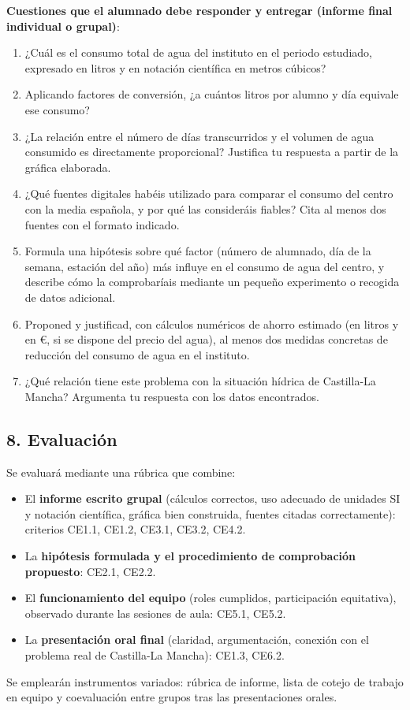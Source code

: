 \documentclass[11pt,a4paper]{article}
\begin{document}
\textbf{Cuestiones que el alumnado debe responder y entregar (informe final individual o grupal)}:
\begin{enumerate}
    \item ¿Cuál es el consumo total de agua del instituto en el periodo estudiado, expresado en litros y en notación científica en metros cúbicos?
    \item Aplicando factores de conversión, ¿a cuántos litros por alumno y día equivale ese consumo?
    \item ¿La relación entre el número de días transcurridos y el volumen de agua consumido es directamente proporcional? Justifica tu respuesta a partir de la gráfica elaborada.
    \item ¿Qué fuentes digitales habéis utilizado para comparar el consumo del centro con la media española, y por qué las consideráis fiables? Cita al menos dos fuentes con el formato indicado.
    \item Formula una hipótesis sobre qué factor (número de alumnado, día de la semana, estación del año) más influye en el consumo de agua del centro, y describe cómo la comprobaríais mediante un pequeño experimento o recogida de datos adicional.
    \item Proponed y justificad, con cálculos numéricos de ahorro estimado (en litros y en €, si se dispone del precio del agua), al menos dos medidas concretas de reducción del consumo de agua en el instituto.
    \item ¿Qué relación tiene este problema con la situación hídrica de Castilla-La Mancha? Argumenta tu respuesta con los datos encontrados.
\end{enumerate}

\subsection*{8. Evaluación}
Se evaluará mediante una rúbrica que combine:
\begin{itemize}
    \item El \textbf{informe escrito grupal} (cálculos correctos, uso adecuado de unidades SI y notación científica, gráfica bien construida, fuentes citadas correctamente): criterios CE1.1, CE1.2, CE3.1, CE3.2, CE4.2.
    \item La \textbf{hipótesis formulada y el procedimiento de comprobación propuesto}: CE2.1, CE2.2.
    \item El \textbf{funcionamiento del equipo} (roles cumplidos, participación equitativa), observado durante las sesiones de aula: CE5.1, CE5.2.
    \item La \textbf{presentación oral final} (claridad, argumentación, conexión con el problema real de Castilla-La Mancha): CE1.3, CE6.2.
\end{itemize}
Se emplearán instrumentos variados: rúbrica de informe, lista de cotejo de trabajo en equipo y coevaluación entre grupos tras las presentaciones orales.
\end{document}
